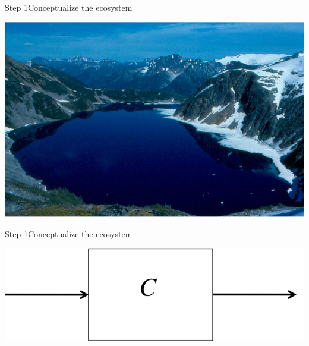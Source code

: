 \documentclass{eecslides}
\begin{document}

	\begin{frame}{Step 1}{Conceptualize the ecosystem}

		\begin{center}
			\includegraphics[height=0.5\textheight]{lake.png}
		\end{center}

	\end{frame}

	\begin{frame}{Step 1}{Conceptualize the ecosystem}

		\begin{center}
			\includegraphics[height=0.4\textheight]{lake_schematic.png}
		\end{center}

	\end{frame}
\end{document}

